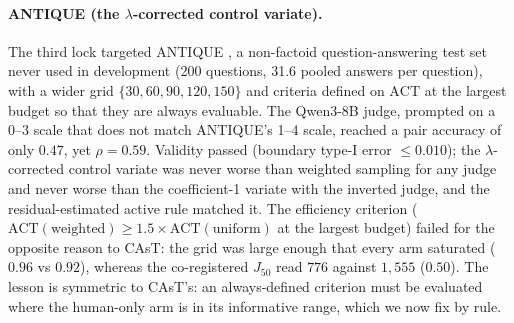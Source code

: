 \documentclass{article}
\newcommand{\ACT}{\mathrm{ACT}}
\newcommand{\Jfifty}{J_{50}}
\begin{document}
\paragraph{ANTIQUE (the $\lambda$-corrected control variate).} The third lock targeted ANTIQUE \citep{hashemi2020antique}, a non-factoid question-answering test set never used in development (200 questions, 31.6 pooled answers per question), with a wider grid $\{30,60,90,120,150\}$ and criteria defined on $\ACT$ at the largest budget so that they are always evaluable. The Qwen3-8B judge, prompted on a 0--3 scale that does not match ANTIQUE's 1--4 scale, reached a pair accuracy of only $0.47$, yet $\rho=0.59$. Validity passed (boundary type-I error $\le0.010$); the $\lambda$-corrected control variate was never worse than weighted sampling for any judge and never worse than the coefficient-1 variate with the inverted judge, and the residual-estimated active rule matched it. The efficiency criterion ($\ACT(\text{weighted})\ge1.5\times\ACT(\text{uniform})$ at the largest budget) failed for the opposite reason to CAsT: the grid was large enough that every arm saturated ($0.96$ vs $0.92$), whereas the co-registered $\Jfifty$ read $776$ against $1{,}555$ ($0.50$). The lesson is symmetric to CAsT's: an always-defined criterion must be evaluated where the human-only arm is in its informative range, which we now fix by rule.
\end{document}
